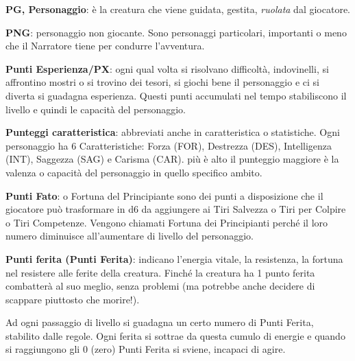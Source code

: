\begin{multicols}{2}
\textbf{PG, Personaggio}: è la creatura che viene guidata, gestita, \emph{ruolata} dal giocatore.

\textbf{PNG}: personaggio non giocante. Sono personaggi particolari, importanti o meno che il Narratore tiene per condurre l'avventura.

\textbf{Punti Esperienza/PX}:   ogni qual volta si risolvano difficoltà, indovinelli, si affrontino mostri o si trovino dei tesori, si giochi bene il personaggio e ci si diverta si guadagna esperienza. Questi punti accumulati nel tempo stabiliscono il livello e quindi le capacità del personaggio.

\textbf{Punteggi caratteristica}:   abbreviati anche in caratteristica o statistiche. Ogni personaggio ha 6 Caratteristiche: Forza (FOR), Destrezza (DES), Intelligenza (INT), Saggezza (SAG) e Carisma (CAR). più è alto il punteggio maggiore è la valenza o capacità del personaggio in quello specifico ambito.

\textbf{Punti Fato}: o Fortuna del Principiante sono dei punti a disposizione che il giocatore può trasformare in d6 da aggiungere ai Tiri Salvezza o Tiri per Colpire o Tiri Competenze. Vengono chiamati Fortuna dei Principianti perché il loro numero diminuisce all'aumentare di livello del personaggio.

\textbf{Punti ferita (Punti Ferita)}: indicano l'energia vitale, la resistenza, la fortuna nel resistere alle ferite della creatura. Finché la creatura ha 1 punto ferita combatterà al suo meglio, senza problemi (ma potrebbe anche decidere di scappare piuttosto che morire!).

\begin{figure}

	\centering
\end{figure}

Ad ogni passaggio di livello si guadagna un certo numero di Punti Ferita, stabilito dalle regole. Ogni ferita si sottrae da questa cumulo di energie e quando si raggiungono gli 0 (zero) Punti Ferita si sviene, incapaci di agire.

%


\end{multicols}
